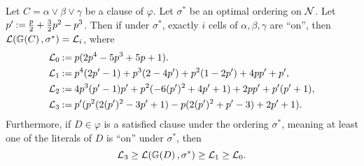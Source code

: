 \begin{lemma}\label{lemma:bayesian_clause}
    Let $ C = \alpha \lor \beta \lor \gamma $ be a clause of $ \varphi $.
    Let $ \sigma^* $ be an optimal ordering on $ \mathcal{N} $.
    Let $p'\mathbin{:=}\frac p2 + \frac 32 p^2 - p^3 $.
    Then if under $ \sigma^* $, exactly $ i $ cells of $ \alpha, \beta, \gamma $ are ``on'', then $ \mathcal{L}(\mathbb{G}\!\left(C\right), \sigma^*) = \mathcal{L}_i $, where \begin{align*}
        \mathcal{L}_0 &\mathbin{:=} p (2 p^4-5 p^3+5 p+1). \\
        \mathcal{L}_1 &\mathbin{:=}  p^4 (2 p'-1)+p^3 (2-4 p')+p^2 (1-2 p')+4 p p'+p', \\
        \mathcal{L}_2 &\mathbin{:=} 4 p^3 (p'-1) p'+p^2 (-6 (p')^2+4 p'+1)+2 p p'+p' (p'+1), \\
        \mathcal{L}_3 &\mathbin{:=} p' (p^2 (2 (p')^2-3 p'+1)-p (2 (p')^2+p'-3)+2 p'+1).
    \end{align*}
    Furthermore, if $ D \in \varphi $ is a satisfied clause under the ordering $ \sigma^* $, meaning at least one of the literals of $ D $ is ``on'' under $ \sigma^* $, then 
    \[
        \mathcal{L}_3 \geq \mathcal{L}(\mathbb{G}\!\left(D\right), \sigma^*) \geq \mathcal{L}_1 \geq \mathcal{L}_0.
    \]
\end{lemma}



